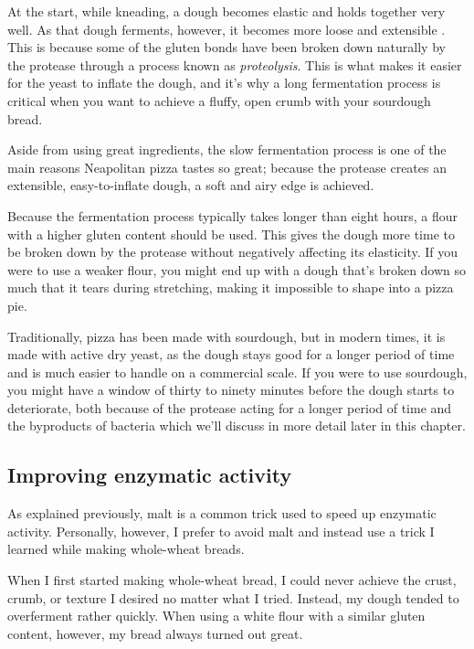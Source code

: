 At the start, while kneading, a dough becomes elastic and holds together very
well. As that dough ferments, however, it becomes more loose and extensible
\cite{protease+enzyme+bread}. This is because some of the gluten bonds have
been broken down naturally by the protease through a process known as
\textit{proteolysis}. This is what makes it easier for the yeast to inflate the
dough, and it's why a long fermentation process is critical when you want to
achieve a fluffy, open crumb with your sourdough bread.

Aside from using great ingredients, the slow fermentation process is one of the
main reasons Neapolitan pizza tastes so great; because the protease creates an
extensible, easy-to-inflate dough, a soft and airy edge is achieved.

Because the fermentation process typically takes longer than eight hours, a
flour with a higher gluten content should be used. This gives the dough more
time to be broken down by the protease without negatively affecting its
elasticity. If you were to use a weaker flour, you might end up with a dough
that's broken down so much that it tears during stretching, making it
impossible to shape into a pizza pie.

Traditionally, pizza has been made with sourdough, but in modern times, it is
made with active dry yeast, as the dough stays good for a longer period of time
and is much easier to handle on a commercial scale. If you were to use
sourdough, you might have a window of thirty to ninety minutes before the dough
starts to deteriorate, both because of the protease acting for a longer period
of time and the byproducts of bacteria which we'll discuss in more detail later
in this chapter.

\subsection{Improving enzymatic activity}

As explained previously, malt is a common trick used to speed up enzymatic
activity. Personally, however, I prefer to avoid malt and instead use a
trick I learned while making whole-wheat breads.

When I first started making whole-wheat bread, I could never achieve the
crust, crumb, or texture I desired no matter what I tried. Instead, my dough
tended to overferment rather quickly. When using a white flour with a similar
gluten content, however, my bread always turned out great.

